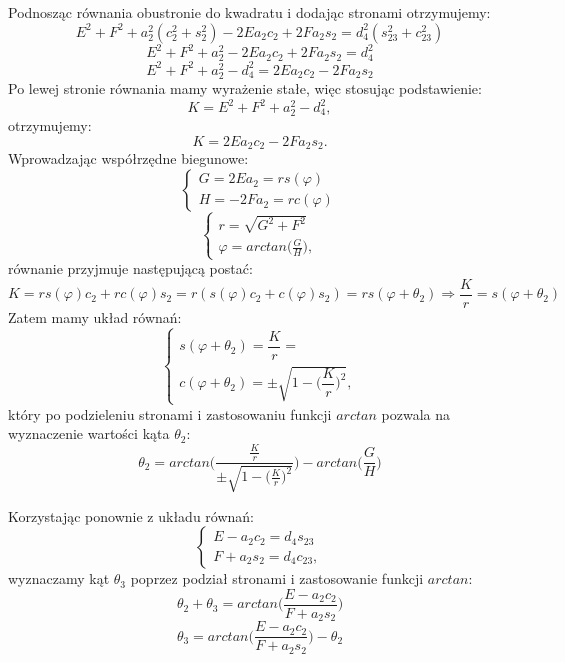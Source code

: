 \documentclass{article}
\begin{document}
Podnosząc równania obustronie do kwadratu i dodając stronami otrzymujemy:
\[
E^2 + F^2 + a_2^2(c_2^2+s_2^2)  -2Ea_2c_2 + 2Fa_2s_2=d_4^2(s_{23}^2+c_{23}^2)
\]
\[
E^2 + F^2 + a_2^2  -2Ea_2c_2 + 2Fa_2s_2=d_4^2
\]
\[
E^2 + F^2 + a_2^2 - d_4^2 =  2Ea_2c_2 - 2Fa_2s_2
\]
Po lewej stronie równania mamy wyrażenie stałe, więc stosując podstawienie:
\[
K=E^2 + F^2 + a_2^2 - d_4^2,
\]
otrzymujemy:
\[
K=2Ea_2c_2 - 2Fa_2s_2 .
\]
Wprowadzając współrzędne biegunowe:
\[
\begin{cases}
G=2Ea_2=rs(\varphi)\\
H=- 2Fa_2=rc(\varphi)
\end{cases}
\]
\[
\begin{cases}
r=\sqrt{G^2+F^2} \\
\varphi = arctan \Big(\frac{G}{H}\Big) ,
\end{cases}
\]
równanie przyjmuje następującą postać:
\[
K=rs(\varphi)c_2 + rc(\varphi)s_2 = r(s(\varphi)c_2 + c(\varphi)s_2) = rs(\varphi+\theta_2) \Rightarrow \dfrac{K}{r}=s(\varphi+\theta_2) 
\]
Zatem mamy układ równań:
\[
\begin{cases}
s(\varphi+\theta_2) =\dfrac{K}{r}=\\
c(\varphi+\theta_2)= \pm \sqrt{1-\Big(\dfrac{K}{r}\Big)^2} ,
\end{cases}
\]
który po podzieleniu stronami i zastosowaniu funkcji $arctan$ pozwala na wyznaczenie warto\'sci kąta $\theta_2$:
\[
\theta_2 = arctan \Bigg( \dfrac{\frac{K}{r}}{\pm \sqrt{1-\Big(\frac{K}{r}\Big)^2}}\Bigg) - arctan \Big(\frac{G}{H}\Big)
\]

Korzystając ponownie z układu równań:
\[
\begin{cases}
E - a_2c_2 = d_4s_{23}\\
F +a_2s_2 = d_4c_{23},
\end{cases}
\]
wyznaczamy kąt $\theta_3$ poprzez podział stronami i zastosowanie funkcji $arctan$:
\[
\theta_2+\theta_3 = arctan \Bigg(\dfrac{E - a_2c_2}{F +a_2s_2} \Bigg)
\]
\[
\theta_3 = arctan \Bigg(\dfrac{E - a_2c_2}{F +a_2s_2} \Bigg) - \theta_2
\]
\end{document}
